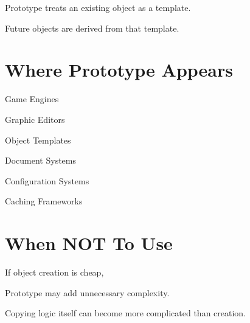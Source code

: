 \documentclass[11pt,a4paper]{book}
\begin{document}

\begin{idea}

Prototype treats an existing
object as a template.


Future objects are derived
from that template.

\end{idea}


\section{Where Prototype Appears}

Game Engines


Graphic Editors


Object Templates


Document Systems


Configuration Systems


Caching Frameworks


\section{When NOT To Use}

\begin{trap}

If object creation is cheap,

Prototype may add unnecessary
complexity.


Copying logic itself can become
more complicated than creation.

\end{trap}
\end{document}
